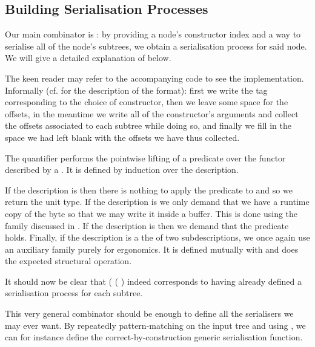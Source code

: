 \subsection{Building Serialisation Processes}

Our main combinator is \IdrisFunction{(\#)}: by providing
a node's constructor index
and a way to serialise all of the node's subtrees,
we obtain a serialisation process for said node.
%
We will give a detailed explanation of  below.


The keen reader may refer to the accompanying code to see the implementation.
Informally (cf.  for the description of the format):
first we write the tag corresponding to the choice of constructor,
then we leave some space for the offsets,
in the meantime we write all of the constructor's arguments and collect the offsets
associated to each subtree while doing so,
and finally we fill in the space we had left blank with the offsets
we have thus collected.

The  quantifier performs the pointwise lifting of a predicate over
the functor described by a . It is defined by induction over
the description.


If the description is  then there is nothing to apply
the predicate to and so we return the unit type.
%
If the description is  we only demand that we have a runtime
copy of the byte so that we may write it inside a buffer. This is done using
the  family discussed in .
%
If the description is  then we demand that the
predicate holds.
%
Finally, if the description is a the  of two subdescriptions, we once
again use an auxiliary family purely for ergonomics. It is defined mutually
with  and does the expected structural operation.


It should now be clear that
( \IdrisKeyword{(} \IdrisKeyword{)}
( \IdrisKeyword{)}) indeed corresponds
to having already defined a serialisation process for each subtree.

This very general combinator should be enough to define all the
serialisers we may ever want.
%
By repeatedly pattern-matching on the input tree and using \IdrisFunction{(\#)},
we can for instance define the correct-by-construction generic serialisation function.

